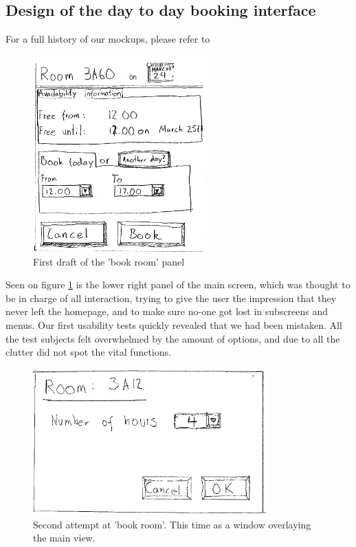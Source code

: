\subsection{Design of the day to day booking interface}
For a full history of our mockups, please refer to %

\begin{figure}[htb]
\begin{center}
\leavevmode
\includegraphics[width=0.6\textwidth]{images/bookRoomMockup}
\end{center}
\caption{First draft of the 'book room' panel}
\label{fig:book_room_mockup}
\end{figure}

Seen on figure \ref{fig:book_room_mockup} is the lower right panel of the main screen, which was thought to be in charge of all interaction, trying to give the user the impression that they never left the homepage, and to make sure no-one got lost in subscreens and menus. Our first usability tests quickly revealed that we had been mistaken. All the test subjects felt overwhelmed by the amount of options, and due to all the clutter did not spot the vital functions.

\begin{figure}[htb]
\begin{center}
\leavevmode
\includegraphics[width=0.8\textwidth]{images/bookRoomMockup2}
\end{center}
\caption{Second attempt at 'book room'. This time as a window overlaying the main view.}
\label{fig:book_room_mockup2}
\end{figure}


